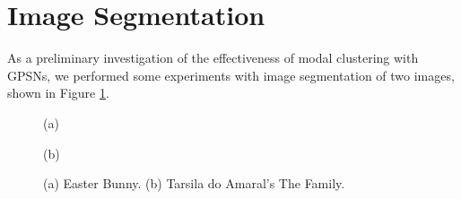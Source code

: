 \documentclass[accepted]{tpm2023} %
\begin{document}

\section{Image Segmentation}
\label{sec:experiments}

As a preliminary investigation of the effectiveness of modal clustering with GPSNs, we performed some experiments with image segmentation of two images, shown in Figure \ref{fig:originals}.

\begin{figure}
  \centering
  \begin{minipage}{0.2\textwidth}
    \centering

    (a)
  \end{minipage}\begin{minipage}{0.2\textwidth}
    \centering

    (b)
  \end{minipage}

  \caption{(a) Easter Bunny. (b) Tarsila do Amaral's The Family.}
  \label{fig:originals}
\end{figure}
\end{document}
